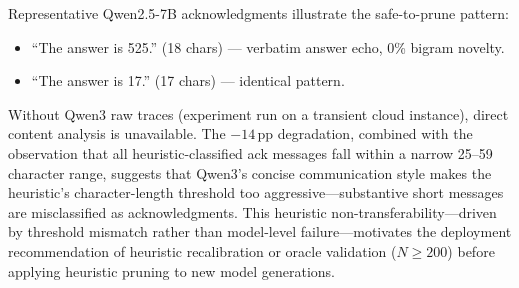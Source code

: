 \noindent Representative Qwen2.5-7B acknowledgments illustrate the safe-to-prune pattern:
\begin{itemize}[nosep, leftmargin=*]
    \item ``The answer is 525.'' (18 chars) --- verbatim answer echo, 0\% bigram novelty.
    \item ``The answer is 17.'' (17 chars) --- identical pattern.
\end{itemize}
Without Qwen3 raw traces (experiment run on a transient cloud instance), direct content analysis is unavailable. The $-14$\,pp degradation, combined with the observation that all heuristic-classified ack messages fall within a narrow 25--59 character range, suggests that Qwen3's concise communication style makes the heuristic's character-length threshold too aggressive---substantive short messages are misclassified as acknowledgments. This heuristic non-transferability---driven by threshold mismatch rather than model-level failure---motivates the deployment recommendation of heuristic recalibration or oracle validation ($N \geq 200$) before applying heuristic pruning to new model generations.
